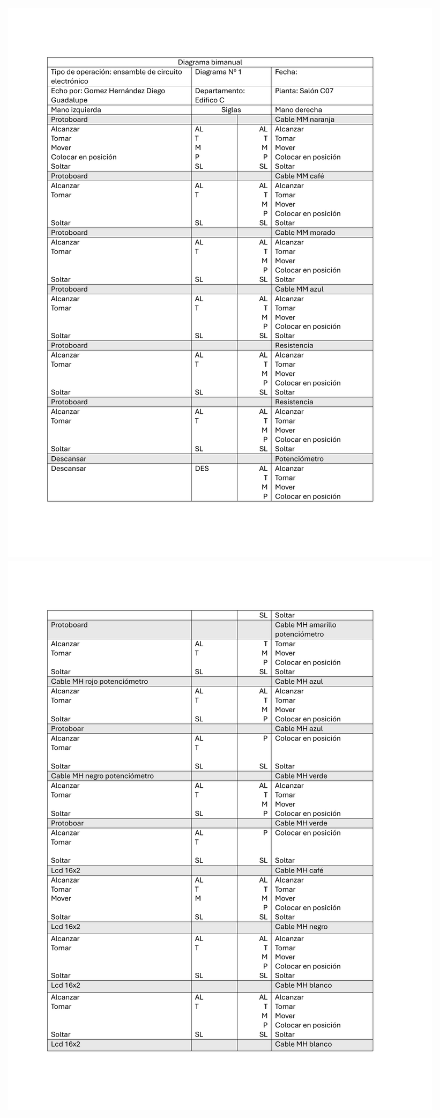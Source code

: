     \begin{figure}[H]
        \centering
        \includegraphics[scale=0.22]{13/img/diagramaBimanualUno.pdf}
        \centering
        \includegraphics[scale=0.22]{13/img/diagramaBimanualDos.pdf}

\end{figure}

